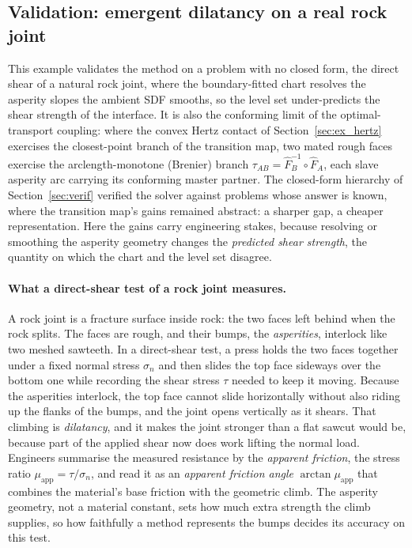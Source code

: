 \documentclass{svjour3}                 %
\newcommand{\tmap}{\tau_{AB}}
\newcommand{\muapp}{\mu_{\mathrm{app}}}
\begin{document}
\subsection{Validation: emergent dilatancy on a real rock joint}\label{sec:cv7}

This example validates the method on a problem with no closed form, the direct shear of a natural rock
joint, where the boundary-fitted chart resolves the asperity slopes the ambient SDF smooths, so the level set
under-predicts the shear strength of the interface. It is also the conforming limit of the optimal-transport
coupling: where the convex Hertz contact of Section~\ref{sec:ex_hertz} exercises the closest-point branch of the
transition map, two mated rough faces exercise the arclength-monotone (Brenier) branch
$\tmap=\hat F_B^{-1}\circ\hat F_A$, each slave asperity arc carrying its conforming master partner. The closed-form hierarchy of
Section~\ref{sec:verif} verified the solver against problems whose answer is known, where the transition map's
gains remained abstract: a sharper gap, a cheaper representation. Here the gains carry engineering
stakes, because resolving or smoothing the asperity geometry changes the \emph{predicted shear strength}, the
quantity on which the chart and the level set disagree.

\paragraph{What a direct-shear test of a rock joint measures.} A rock joint is a fracture surface inside rock: the two faces left behind when the rock splits. The faces are rough, and their bumps, the \emph{asperities}, interlock like two meshed sawteeth. In a direct-shear test, a press holds the two faces together under a fixed normal stress $\sigma_n$ and then slides the top face sideways over the bottom one while recording the shear stress $\tau$ needed to keep it moving. Because the asperities interlock, the top face cannot slide horizontally without also riding up the flanks of the bumps, and the joint opens vertically as it shears. That climbing is \emph{dilatancy}, and it makes the joint stronger than a flat sawcut would be, because part of the applied shear now does work lifting the normal load. Engineers summarise the measured resistance by the \emph{apparent friction}, the stress ratio $\muapp=\tau/\sigma_n$, and read it as an \emph{apparent friction angle} $\arctan\muapp$ that combines the material's base friction with the geometric climb. The asperity geometry, not a material constant, sets how much extra strength the climb supplies, so how faithfully a method represents the bumps decides its accuracy on this test.
\end{document}
